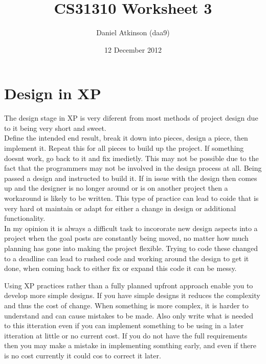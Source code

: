 \documentclass[11pt]{article}
\begin{document}
\title{CS31310 Worksheet 3}

\author{Daniel Atkinson (daa9)}
\date{12 December 2012}

\maketitle

\section{Design in XP}
The design stage in XP is very diferent from most methods of project design due to it being very short and sweet.
\\Define the intended end result, break it down into pieces, design a piece, then implement it.  Repeat this for all pieces to build up the project.  If something doesnt work, go back to it and fix imedietly.
This may not be possible due to the fact that the programmers may not be involved in the design process at all.  Being passed a design and instructed to build it.  If in issue with the design then comes up and the designer is no longer around or is on another project then a workaround is likely to be written.  This type of practice can lead to coide that is very hard ot maintain or adapt for either a change in design or additional functionality.
\\In my opinion it is always a difficult task to incororate new design aspects into a project when the goal posts are constantly being moved, no matter how much planning has gone into making the project flexible.  Trying to code these changed to a deadline can lead to rushed code and working around the design to get it done, when coming back to either fix or expand this code it can be messy.

Using XP practices rather than a fully planned upfront approach enable you to develop more simple designs.  If you have simple designs it reduces the complexity and thus the cost of change.  When something is more complex, it is harder to understand and can cause mistakes to be made.  Also only write what is needed to this itteration even if you can implement something to be using in a later itteration at little or no current cost.  If you do not have the full requirements then you may make a mistake in implementing somthing early, and even if there is no cost currently it could cos to correct it later.
\end{document}
